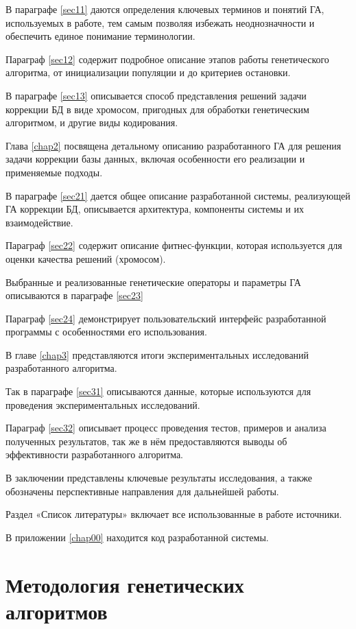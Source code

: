 \documentclass[master,paper]{pmk-graduate}
\begin{document}
В параграфе \ref{sec11} даются определения ключевых терминов и понятий ГА, используемых в работе, тем самым позволяя избежать неоднозначности и обеспечить единое понимание терминологии.

Параграф \ref{sec12} содержит подробное описание этапов работы генетического алгоритма, от инициализации популяции и до критериев остановки.

В параграфе \ref{sec13} описывается способ представления решений задачи коррекции БД в виде хромосом, пригодных для обработки генетическим алгоритмом, и другие виды кодирования.

Глава \ref{chap2} посвящена детальному описанию разработанного ГА для решения задачи коррекции базы данных, включая особенности его реализации и применяемые подходы.

В параграфе \ref{sec21} дается общее описание разработанной системы, реализующей ГА коррекции БД, описывается архитектура, компоненты системы и их взаимодействие.

Параграф \ref{sec22} содержит описание фитнес-функции, которая используется для оценки качества решений (хромосом).

Выбранные и реализованные генетические операторы и параметры ГА описываются в параграфе \ref{sec23}

Параграф \ref{sec24} демонстрирует пользовательский интерфейс разработанной программы с особенностями его использования.

В главе \ref{chap3} представляются итоги экспериментальных исследований разработанного алгоритма.

Так в параграфе \ref{sec31} описываются данные, которые используются для проведения экспериментальных исследований.

Параграф \ref{sec32} описывает процесс проведения тестов, примеров и анализа полученных результатов, так же в нём предоставляются выводы об эффективности разработанного алгоритма.

В заключении представлены ключевые результаты исследования, а также обозначены перспективные направления для дальнейшей работы.

Раздел «Список литературы» включает все использованные в работе источники.

В приложении \ref{chap00} находится код разработанной системы.

\chapter{Методология генетических алгоритмов}
\label{chap1} 
\end{document}
